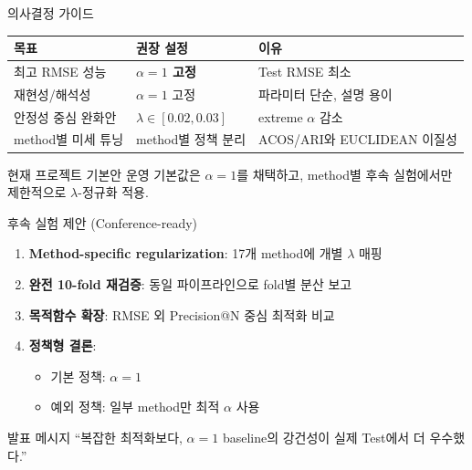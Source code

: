 \documentclass[aspectratio=169,10pt]{beamer}
\begin{document}
\begin{frame}{의사결정 가이드}
	\renewcommand{\arraystretch}{1.3}
	\begin{tabular}{l|l|l}
		\toprule
		\textbf{목표} & \textbf{권장 설정} & \textbf{이유} \\
		\midrule
		최고 RMSE 성능 & \textbf{\(\alpha=1\) 고정} & Test RMSE 최소 \\
		재현성/해석성 & \(\alpha=1\) 고정 & 파라미터 단순, 설명 용이 \\
		안정성 중심 완화안 & \(\lambda\in[0.02,0.03]\) & extreme \(\alpha\) 감소 \\
		method별 미세 튜닝 & method별 정책 분리 & ACOS/ARI와 EUCLIDEAN 이질성 \\
		\bottomrule
	\end{tabular}

	\vspace{0.5em}
	\begin{alertblock}{현재 프로젝트 기본안}
		운영 기본값은 \textbf{\(\alpha=1\)}를 채택하고,
		method별 후속 실험에서만 제한적으로 \(\lambda\)-정규화 적용.
	\end{alertblock}
\end{frame}

\begin{frame}{후속 실험 제안 (Conference-ready)}
	\begin{enumerate}
		\item \textbf{Method-specific regularization}: 17개 method에 개별 \(\lambda\) 매핑
		\item \textbf{완전 10-fold 재검증}: 동일 파이프라인으로 fold별 분산 보고
		\item \textbf{목적함수 확장}: RMSE 외 Precision@N 중심 최적화 비교
		\item \textbf{정책형 결론}: 
			\begin{itemize}
				\item 기본 정책: \(\alpha=1\)
				\item 예외 정책: 일부 method만 최적 \(\alpha\) 사용
			\end{itemize}
	\end{enumerate}

	\vspace{0.4em}
	\begin{block}{발표 메시지}
		``복잡한 최적화보다, \(\alpha=1\) baseline의 강건성이 실제 Test에서 더 우수했다.''
	\end{block}
\end{frame}
\end{document}
